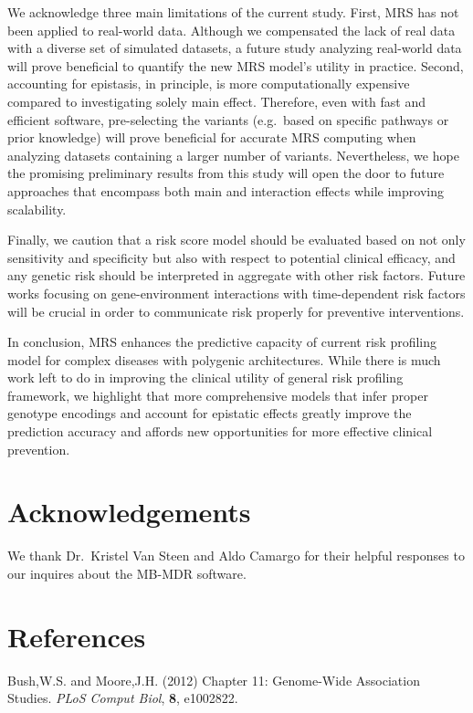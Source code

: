 \documentclass{ws-procs11x85}
\begin{document}
We acknowledge three main limitations of the current study. First, MRS has not
been applied to real-world data. Although we compensated the lack of
real data with a diverse set of simulated datasets, a future study
analyzing real-world data will prove beneficial to quantify the new MRS
model's utility in practice. Second, accounting for epistasis, in
principle, is more computationally expensive compared to
investigating solely main effect. Therefore, even with fast and
efficient software, pre-selecting the variants (e.g.~based on specific
pathways or prior knowledge) will prove beneficial for accurate MRS
computing when analyzing datasets containing a larger number of
variants. Nevertheless, we hope the promising preliminary results from
this study will open the door to future approaches that encompass both
main and interaction effects while improving scalability.

Finally, we caution that a risk score model should be evaluated based on
not only sensitivity and specificity but also with respect to potential
clinical efficacy, and any genetic risk should be interpreted in
aggregate with other risk factors. Future works focusing on
gene-environment interactions with time-dependent risk factors will be
crucial in order to communicate risk properly for preventive
interventions.

In conclusion, MRS enhances the predictive capacity of current risk
profiling model for complex diseases with polygenic architectures. While
there is much work left to do in improving the clinical
utility of general risk profiling framework, we highlight that more
comprehensive models that infer proper genotype encodings and account
for epistatic effects greatly improve the prediction accuracy and
affords new opportunities for more effective clinical prevention.

\hypertarget{acknowledgement}{%
\section{Acknowledgements}\label{acknowledgement}}

We thank Dr.~Kristel Van Steen and Aldo Camargo for their helpful
responses to our inquires about the MB-MDR software.

\hypertarget{references}{%
\section*{References}\label{references}}

\hypertarget{refs}{}
\leavevmode\hypertarget{ref-iFUfVw9V}{}%
Bush,W.S. and Moore,J.H. (2012) Chapter 11: Genome-Wide Association
Studies. \emph{PLoS Comput Biol}, \textbf{8}, e1002822.
\end{document}
